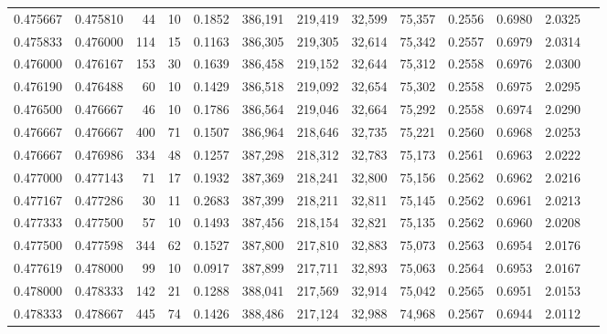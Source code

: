 \begin{tabular}{rrrrrrrrrrrrr}
0.475667 & 0.475810 &    44 &  10 &                                     0.1852 & 386,191 & 219,419 &  32,599 &  75,357 & 0.2556 & 0.6980 & 2.0325 \\
0.475833 & 0.476000 &   114 &  15 &                                     0.1163 & 386,305 & 219,305 &  32,614 &  75,342 & 0.2557 & 0.6979 & 2.0314 \\
0.476000 & 0.476167 &   153 &  30 &                                     0.1639 & 386,458 & 219,152 &  32,644 &  75,312 & 0.2558 & 0.6976 & 2.0300 \\
0.476190 & 0.476488 &    60 &  10 &                                     0.1429 & 386,518 & 219,092 &  32,654 &  75,302 & 0.2558 & 0.6975 & 2.0295 \\
0.476500 & 0.476667 &    46 &  10 &                                     0.1786 & 386,564 & 219,046 &  32,664 &  75,292 & 0.2558 & 0.6974 & 2.0290 \\
0.476667 & 0.476667 &   400 &  71 &                                     0.1507 & 386,964 & 218,646 &  32,735 &  75,221 & 0.2560 & 0.6968 & 2.0253 \\
0.476667 & 0.476986 &   334 &  48 &                                     0.1257 & 387,298 & 218,312 &  32,783 &  75,173 & 0.2561 & 0.6963 & 2.0222 \\
0.477000 & 0.477143 &    71 &  17 &                                     0.1932 & 387,369 & 218,241 &  32,800 &  75,156 & 0.2562 & 0.6962 & 2.0216 \\
0.477167 & 0.477286 &    30 &  11 &                                     0.2683 & 387,399 & 218,211 &  32,811 &  75,145 & 0.2562 & 0.6961 & 2.0213 \\
0.477333 & 0.477500 &    57 &  10 &                                     0.1493 & 387,456 & 218,154 &  32,821 &  75,135 & 0.2562 & 0.6960 & 2.0208 \\
0.477500 & 0.477598 &   344 &  62 &                                     0.1527 & 387,800 & 217,810 &  32,883 &  75,073 & 0.2563 & 0.6954 & 2.0176 \\
0.477619 & 0.478000 &    99 &  10 &                                     0.0917 & 387,899 & 217,711 &  32,893 &  75,063 & 0.2564 & 0.6953 & 2.0167 \\
0.478000 & 0.478333 &   142 &  21 &                                     0.1288 & 388,041 & 217,569 &  32,914 &  75,042 & 0.2565 & 0.6951 & 2.0153 \\
0.478333 & 0.478667 &   445 &  74 &                                     0.1426 & 388,486 & 217,124 &  32,988 &  74,968 & 0.2567 & 0.6944 & 2.0112 \\

\end{tabular}
